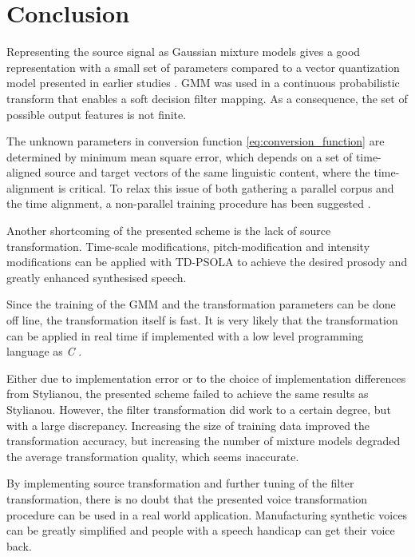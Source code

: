 \chapter{Conclusion} %
\label{cha:conclusion}
Representing the source signal as Gaussian mixture models gives a good representation with a small set of parameters compared to a vector quantization model presented in earlier studies \cite{abe88}. GMM was used in a continuous probabilistic transform that enables a soft decision filter mapping. As a consequence, the set of possible output features is not finite.

The unknown parameters in conversion function \eqref{eq:conversion_function} are determined by minimum mean square error, which depends on a set of time-aligned source and target vectors of the same linguistic content, where the time-alignment is critical. To relax this issue of both gathering a parallel corpus and the time alignment, a non-parallel training procedure has been suggested \cite{mouchtaris06,ye06}.

Another shortcoming of the presented scheme is the lack of source transformation. Time-scale modifications, pitch-modification and intensity modifications can be applied with \eg TD-PSOLA to achieve the desired prosody and greatly enhanced synthesised speech.

Since the training of the GMM and the transformation parameters can be done off line, the transformation itself is fast. It is very likely that the transformation can be applied in real time if implemented with a low level programming language as \emph{C} \cite{kernighan88}. 

Either due to implementation error or to the choice of implementation differences from Stylianou, the presented scheme failed to achieve the same results as Stylianou. However, the filter transformation did work to a certain degree, but with a large discrepancy. Increasing the size of training data improved the transformation accuracy, but increasing the number of mixture models degraded the average transformation quality, which seems inaccurate.

By implementing source transformation and further tuning of the filter transformation, there is no doubt that the presented voice transformation procedure can be used in a real world application. Manufacturing synthetic voices can be greatly simplified and people with a speech handicap can get their voice back.

